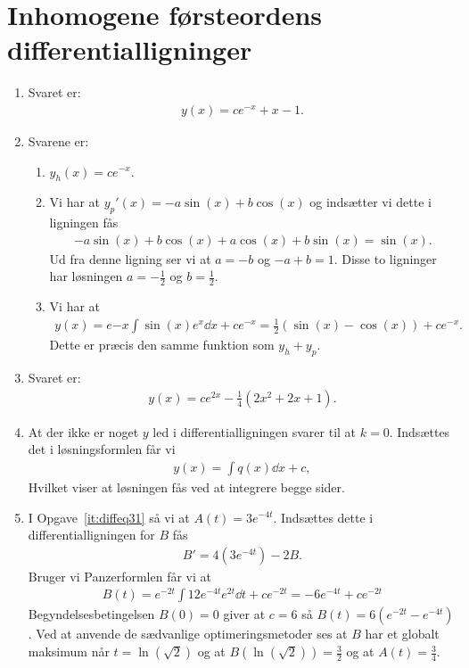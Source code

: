 \section{Inhomogene førsteordens differentialligninger}
\begin{enumerate}
	
	
	
	\item Svaret er:
	\begin{align*}
	y(x)=ce^{-x}+x-1.
	\end{align*}

	
	\item Svarene er:
	\begin{enumerate}
		\item $y_h(x)=ce^{-x}$.
		\item Vi har at $y_p'(x)=-a\sin(x)+b\cos(x)$ og indsætter vi dette i ligningen fås
		\begin{align*}
		-a\sin(x)+b\cos(x)+a\cos(x)+b\sin(x)=\sin(x).
		\end{align*} 
		Ud fra denne ligning ser vi at $a=-b$ og $-a+b=1$. Disse to ligninger har løsningen $a=-\frac{1}{2}$ og $b=\frac{1}{2}$.
		
		\item Vi har at 
		\begin{align*}
		y(x)=e{-x}\int \sin(x)e^x\dd x+ce^{-x}=\frac{1}{2}(\sin(x)-\cos(x))+ce^{-x}.
		\end{align*}
		Dette er præcis den samme funktion som $y_h+y_p$. 
	\end{enumerate}

	\item Svaret er:
	\begin{align*}
	y(x)=ce^{2x} -\frac{1}{4}(2x^2+2x+1).
	\end{align*}

	
	\item At der ikke er noget $y$ led i differentialligningen svarer til at $k=0$. Indsættes det i løsningsformlen får vi
	\begin{align*}
	y(x)=\int q(x)\dd x+ c,
	\end{align*}
	Hvilket viser at løsningen fås ved at integrere begge sider.
	
	
	
	\item I Opgave~\ref{it:diffeq31} så vi at $A(t)=3e^{-4t}$. Indsættes dette i differentialligningen for $B$ fås
	\begin{align*}
	B'=4(3e^{-4t})-2B.
	\end{align*}
	Bruger vi Panzerformlen får vi at
	\begin{align*}
	B(t)=e^{-2t} \int 12e^{-4t}e^{2t}\dd t +ce^{-2t}=-6e^{-4t}+ ce^{-2t}
	\end{align*}
	Begyndelsesbetingelsen $B(0)=0$ giver at $c=6$ så $B(t)=6(e^{-2t}-e^{-4t})$. Ved at anvende de sædvanlige optimeringsmetoder ses at $B$ har et globalt maksimum når $t=\ln(\sqrt{2})$ og at $B(\ln(\sqrt{2}))=\frac{3}{2}$ og at $A(t)=\frac{3}{4}$.
	

\end{enumerate}
